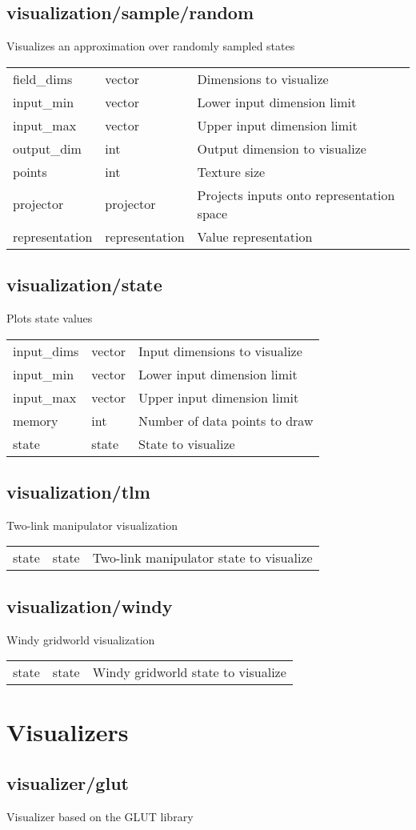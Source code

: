 \subsection{visualization/sample/random}
\noindent Visualizes an approximation over randomly sampled states\\

\noindent\begin{tabular}{@{}lll@{}}
field\_dims&vector&Dimensions to visualize\\
input\_min&vector&Lower input dimension limit\\
input\_max&vector&Upper input dimension limit\\
output\_dim&int&Output dimension to visualize\\
points&int&Texture size\\
projector&projector&Projects inputs onto representation space\\
representation&representation&Value representation\\
\end{tabular}
\subsection{visualization/state}
\noindent Plots state values\\

\noindent\begin{tabular}{@{}lll@{}}
input\_dims&vector&Input dimensions to visualize\\
input\_min&vector&Lower input dimension limit\\
input\_max&vector&Upper input dimension limit\\
memory&int&Number of data points to draw\\
state&state&State to visualize\\
\end{tabular}
\subsection{visualization/tlm}
\noindent Two-link manipulator visualization\\

\noindent\begin{tabular}{@{}lll@{}}
state&state&Two-link manipulator state to visualize\\
\end{tabular}
\subsection{visualization/windy}
\noindent Windy gridworld visualization\\

\noindent\begin{tabular}{@{}lll@{}}
state&state&Windy gridworld state to visualize\\
\end{tabular}
\section{Visualizers}
\subsection{visualizer/glut}
\noindent Visualizer based on the GLUT library\\

